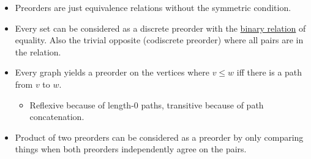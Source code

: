 \begin{itemize}
    \item Preorders are just equivalence relations without the symmetric condition.
    \item Every set can be considered as a discrete preorder with the \href{doc/1 math/Seven Sketches in Compositionality/1 Generative Effects/2 What is order/Function}{binary relation} of equality. Also the trivial opposite (codiscrete preorder) where all pairs are in the relation.
    \item Every graph yields a preorder on the vertices where $v \leq w$ iff there is a path from $v$ to $w$.
          \begin{itemize}
            \item Reflexive because of length-0 paths, transitive because of path concatenation.
          \end{itemize}
    \item Product of two preorders can be considered as a preorder by only comparing things when both preorders independently agree on the pairs.
  \end{itemize}